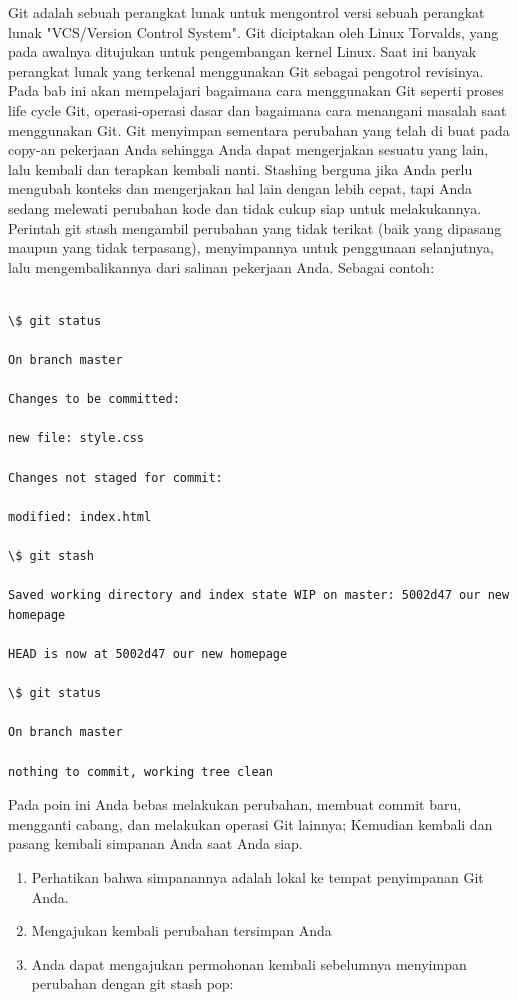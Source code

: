 Git adalah sebuah perangkat lunak untuk mengontrol versi sebuah 
perangkat lunak "VCS/Version Control System". Git diciptakan oleh Linux 
Torvalds, yang pada awalnya ditujukan untuk pengembangan kernel Linux. 
Saat ini banyak perangkat lunak yang terkenal menggunakan Git sebagai 
pengotrol revisinya.
\vspace{12pt}
Pada bab ini akan mempelajari bagaimana cara menggunakan Git seperti 
proses life cycle Git, operasi-operasi dasar dan bagaimana cara 
menangani masalah saat menggunakan Git.
\vspace{12pt}
Git menyimpan sementara perubahan yang telah di buat pada copy-an 
pekerjaan Anda sehingga Anda dapat mengerjakan sesuatu yang lain, lalu 
kembali dan terapkan kembali nanti. Stashing berguna jika Anda perlu 
mengubah konteks dan mengerjakan hal lain dengan lebih cepat, tapi Anda 
sedang melewati perubahan kode dan tidak cukup siap untuk melakukannya. 
\vspace{12pt}
Perintah git stash mengambil perubahan yang tidak terikat (baik yang 
dipasang maupun yang tidak terpasang), menyimpannya untuk penggunaan 
selanjutnya, lalu mengembalikannya dari salinan pekerjaan Anda. Sebagai 
contoh:
\vspace{12pt}
\begin{verbatim}

\$ git status

On branch master

Changes to be committed:

new file: style.css

Changes not staged for commit:

modified: index.html

\$ git stash

Saved working directory and index state WIP on master: 5002d47 our new 
homepage

HEAD is now at 5002d47 our new homepage

\$ git status

On branch master

nothing to commit, working tree clean
\end{verbatim}

Pada poin ini Anda bebas melakukan perubahan, membuat commit baru, 
mengganti cabang, dan melakukan operasi Git lainnya; Kemudian kembali 
dan pasang kembali simpanan Anda saat Anda siap.
\vspace{12pt}
\begin{enumerate}
\item Perhatikan bahwa simpanannya adalah lokal ke tempat penyimpanan 
Git Anda. 
\item Mengajukan kembali perubahan tersimpan Anda
\item Anda dapat mengajukan permohonan kembali sebelumnya menyimpan 
perubahan dengan git stash pop:
\setcounter{numberedCntD}{\theenumi}
\end{enumerate}

